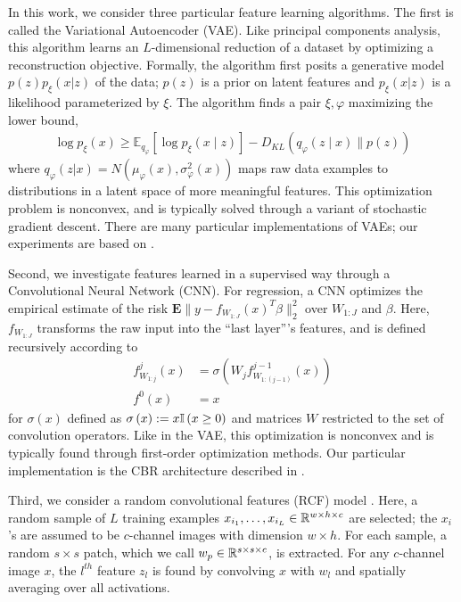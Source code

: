 In this work, we consider three particular feature learning algorithms. The
first is called the Variational Autoencoder (VAE). Like principal components
analysis, this algorithm learns an $L$-dimensional reduction of a dataset by
optimizing a reconstruction objective. Formally, the algorithm first posits a
generative model $p\left(z\right)p_{\xi}\left(x \vert z\right)$ of the data;
$p\left(z\right)$ is a prior on latent features and $p_{\xi}\left(x \vert
z\right)$ is a likelihood parameterized by $\xi$. The algorithm finds a pair
$\xi, \varphi$ maximizing the lower bound,
\begin{align*}
\log p_{\xi}\left(x\right) \geq  \mathbb{E}_{q_{\varphi}}\left[\log p_{\xi}(x \mid z)\right]-D_{KL}\left(q_{\varphi}(z \mid x) \| p(z)\right)
\end{align*}
where $q_{\varphi}\left(z \vert x\right) = N\left(\mu_{\varphi}\left(x\right),
\sigma^{2}_{\varphi}\left(x\right)\right)$ maps raw data examples to
distributions in a latent space of more meaningful features. This optimization
problem is nonconvex, and is typically solved through a variant of stochastic
gradient descent. There are many particular implementations of VAEs; our
experiments are based on \citep{van2017neural}.

Second, we investigate features learned in a supervised way through a
Convolutional Neural Network (CNN). For regression, a CNN optimizes the
empirical estimate of the risk $\mathbf{E}\|y -
f_{W_{1:J}}\left(x\right)^{T}\beta\|_{2}^{2}$ over $W_{1:J}$ and $\beta$. Here,
$f_{W_{1:J}}$ transforms the raw input into the ``last layer''’s features, and
is defined recursively according to
\begin{align*}
f^{j}_{W_{1:j}}\left(x\right) &= \sigma\left(W_{j}f^{j - 1}_{W_{1:(j - 1)}}\left(x\right)\right)\\
f^{0}\left(x\right) &= x
\end{align*}
for $\sigma\left(x\right)$ defined as $\sigma\left(x\right) := x \mathbb{I}\left({x \geq
  0}\right)$ and matrices $W$ restricted to the set of convolution operators. Like in
the VAE, this optimization is nonconvex and is typically found through
first-order optimization methods. Our particular implementation is the CBR
architecture described in \citep{raghu2017svcca}.

Third, we consider a random convolutional features (RCF) model
\citep{rahimi2008weighted}. Here, a random sample of $L$ training examples
$x_{i_1}, \dots, x_{i_L} \in \mathbb{R}^{w \times h \times c}$ are selected; the
$x_{i}$'s are assumed to be $c$-channel images with dimension $w\times h$. For
each sample, a random $s \times s$ patch, which we call $w_{p} \in \mathbb{R}^{s
  \times s \times c}$, is extracted. For any $c$-channel image $x$, the $l^{th}$
feature $z_{l}$ is found by convolving $x$ with $w_{l}$ and spatially averaging
over all activations.

